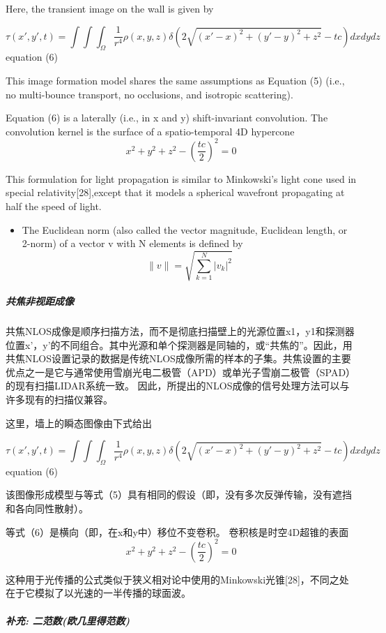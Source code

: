 \documentclass[11pt]{article}
\providecommand{\tightlist}{%
      \setlength{\itemsep}{0pt}\setlength{\parskip}{0pt}}
\begin{document}
Here, the transient image on the wall is given by

\[\tau(x',y',t)=\int\int\int_{\Omega}\frac{1}{r^{4}}\rho(x,y,z)\delta(2\sqrt{(x'-x)^{2}+(y'-y)^{2}+z^{2}}-tc)dxdydz\]
equation (6)

This image formation model shares the same assumptions as Equation (5)
(i.e., no multi-bounce transport, no occlusions, and isotropic
scattering).

Equation (6) is a laterally (i.e., in x and y) shift-invariant
convolution. The convolution kernel is the surface of a spatio-temporal
4D hypercone \[x^{2}+y^{2}+z^{2}-(\frac{tc}{2})^{2}=0\]

This formulation for light propagation is similar to Minkowski's light
cone used in special relativity{[}28{]},except that it models a
spherical wavefront propagating at half the speed of light.

\begin{itemize}
\tightlist
\item
  The Euclidean norm (also called the vector magnitude, Euclidean
  length, or 2-norm) of a vector v with N elements is defined by
  \[\|v\|=\sqrt{\sum^{N}_{k=1}|v_{k}|^{2}}\]
\end{itemize}

    \subparagraph{共焦非视距成像}\label{ux5171ux7126ux975eux89c6ux8dddux6210ux50cf}

共焦NLOS成像是顺序扫描方法，而不是彻底扫描壁上的光源位置x1，y1和探测器位置x'，y'的不同组合。其中光源和单个探测器是同轴的，或``共焦的''。因此，用共焦NLOS设置记录的数据是传统NLOS成像所需的样本的子集。共焦设置的主要优点之一是它与通常使用雪崩光电二极管（APD）或单光子雪崩二极管（SPAD）的现有扫描LIDAR系统一致。
因此，所提出的NLOS成像的信号处理方法可以与许多现有的扫描仪兼容。

这里，墙上的瞬态图像由下式给出

\[\tau(x',y',t)=\int\int\int_{\Omega}\frac{1}{r^{4}}\rho(x,y,z)\delta(2\sqrt{(x'-x)^{2}+(y'-y)^{2}+z^{2}}-tc)dxdydz\]
equation (6)

该图像形成模型与等式（5）具有相同的假设（即，没有多次反弹传输，没有遮挡和各向同性散射）。

等式（6）是横向（即，在x和y中）移位不变卷积。 卷积核是时空4D超锥的表面
\[x^{2}+y^{2}+z^{2}-(\frac{tc}{2})^{2}=0\]

这种用于光传播的公式类似于狭义相对论中使用的Minkowski光锥{[}28{]}，不同之处在于它模拟了以光速的一半传播的球面波。

\subparagraph{补充:
二范数(欧几里得范数)}\label{ux8865ux5145-ux4e8cux8303ux6570ux6b27ux51e0ux91ccux5f97ux8303ux6570}
\end{document}
